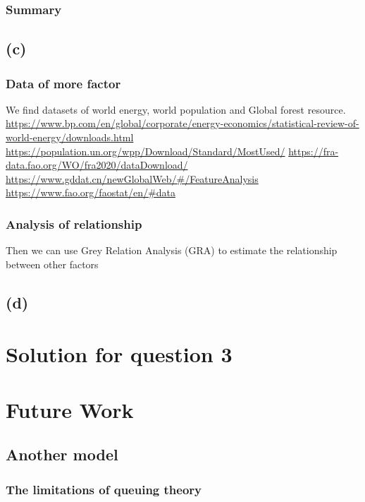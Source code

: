 \documentclass{apmcmthesis}
\begin{document}
\subsubsection{Summary}

\subsection{(c)}
\subsubsection{Data of more factor}
We find datasets of world energy, world population and Global forest resource. 
\url{https://www.bp.com/en/global/corporate/energy-economics/statistical-review-of-world-energy/downloads.html}
\url{https://population.un.org/wpp/Download/Standard/MostUsed/}
\url{https://fra-data.fao.org/WO/fra2020/dataDownload/} 
\url{https://www.gddat.cn/newGlobalWeb/#/FeatureAnalysis}
\url{https://www.fao.org/faostat/en/#data}

\subsubsection{Analysis of relationship}
Then we can use Grey Relation Analysis (GRA) to estimate the relationship between other factors



\subsection{(d)}



\newpage
\section{Solution for question 3}



\section{Future Work}
\subsection{Another model}
\subsubsection{The limitations of queuing theory}
\end{document}
